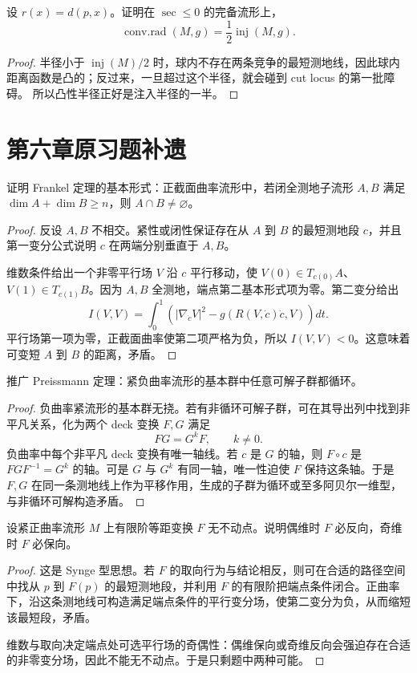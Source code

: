 \documentclass[11pt,a4paper,openany]{ctexbook}
\numberwithin{equation}{chapter}
\begin{document}
\begin{exercise}
设 \(r(x)=d(p,x)\)。证明在 \(\sec\le 0\) 的完备流形上，
\[
\operatorname{conv.rad}(M,g)=\frac12\operatorname{inj}(M,g).
\]
\end{exercise}
\begin{proof}
半径小于 \(\operatorname{inj}(M)/2\) 时，球内不存在两条竞争的最短测地线，因此球内距离函数是凸的；反过来，一旦超过这个半径，就会碰到 cut locus 的第一批障碍。
所以凸性半径正好是注入半径的一半。
\end{proof}
\section{第六章原习题补遗}

\begin{problem}
证明 Frankel 定理的基本形式：正截面曲率流形中，若闭全测地子流形 \(A,B\) 满足 \(\dim A+\dim B\ge n\)，则 \(A\cap B\ne\varnothing\)。
\end{problem}
\begin{proof}
反设 \(A,B\) 不相交。紧性或闭性保证存在从 \(A\) 到 \(B\) 的最短测地段 \(c\)，并且第一变分公式说明 \(c\) 在两端分别垂直于 \(A,B\)。

维数条件给出一个非零平行场 \(V\) 沿 \(c\) 平行移动，使 \(V(0)\in T_{c(0)}A\)、\(V(1)\in T_{c(1)}B\)。因为 \(A,B\) 全测地，端点第二基本形式项为零。第二变分给出
\[
I(V,V)=\int_0^1\left(|\nabla_{\dot c}V|^2-g(R(V,\dot c)\dot c,V)\right)dt.
\]
平行场第一项为零，正截面曲率使第二项严格为负，所以 \(I(V,V)<0\)。这意味着可变短 \(A\) 到 \(B\) 的距离，矛盾。
\end{proof}

\begin{problem}
推广 Preissmann 定理：紧负曲率流形的基本群中任意可解子群都循环。
\end{problem}
\begin{proof}
负曲率紧流形的基本群无挠。若有非循环可解子群，可在其导出列中找到非平凡关系，化为两个 deck 变换 \(F,G\) 满足
\[
FG=G^kF,\qquad k\ne0.
\]
负曲率中每个非平凡 deck 变换有唯一轴线。若 \(c\) 是 \(G\) 的轴，则 \(F\circ c\) 是 \(FGF^{-1}=G^k\) 的轴。可是 \(G\) 与 \(G^k\) 有同一轴，唯一性迫使 \(F\) 保持这条轴。于是 \(F,G\) 在同一条测地线上作为平移作用，生成的子群为循环或至多阿贝尔一维型，与非循环可解构造矛盾。
\end{proof}

\begin{problem}
设紧正曲率流形 \(M\) 上有限阶等距变换 \(F\) 无不动点。说明偶维时 \(F\) 必反向，奇维时 \(F\) 必保向。
\end{problem}
\begin{proof}
这是 Synge 型思想。若 \(F\) 的取向行为与结论相反，则可在合适的路径空间中找从 \(p\) 到 \(F(p)\) 的最短测地段，并利用 \(F\) 的有限阶把端点条件闭合。正曲率下，沿这条测地线可构造满足端点条件的平行变分场，使第二变分为负，从而缩短该最短段，矛盾。

维数与取向决定端点处可选平行场的奇偶性：偶维保向或奇维反向会强迫存在合适的非零变分场，因此不能无不动点。于是只剩题中两种可能。
\end{proof}
\end{document}
